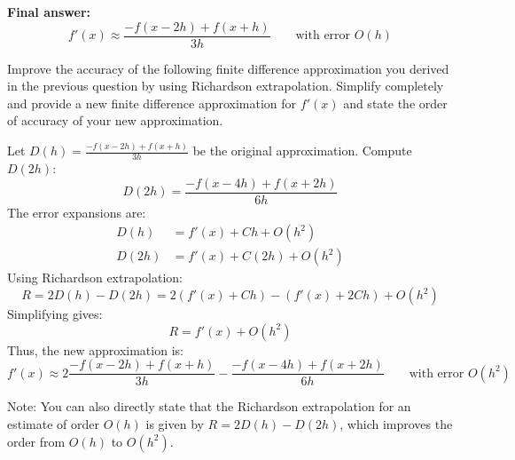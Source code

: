 \documentclass[reqno, answers]{exam}
\begin{document}
\begin{questions}
\begin{solution}
    \textbf{Final answer:}
    \[
      \boxed{
        f'(x) \approx \frac{-f(x-2h) + f(x+h)}{3h}
      }
      \qquad \text{with error } O(h)
    \]
  \end{solution}

  \newpage

  \question[8]
  Improve the accuracy of the following finite difference approximation you derived in the previous question by using Richardson extrapolation. Simplify completely and provide a new finite difference approximation for $f'(x)$ and state the order of accuracy of your new approximation.

  \begin{solution}
    Let $D(h) = \frac{-f(x-2h) + f(x+h)}{3h}$ be the original approximation. Compute $D(2h)$:
    \[
      D(2h) = \frac{-f(x-4h) + f(x+2h)}{6h}
    \]
    The error expansions are:
    \begin{align*}
      D(h) &= f'(x) + C h + O(h^2) \\
      D(2h) &= f'(x) + C (2h) + O(h^2)
    \end{align*}
    Using Richardson extrapolation:
    \[
      R = 2 D(h) - D(2h) = 2\left(f'(x) + C h\right) - \left(f'(x) + 2C h\right) + O(h^2)
    \]
    Simplifying gives:
    \[
      R = f'(x) + O(h^2)
    \]
    Thus, the new approximation is:
    \[
      \boxed{
        f'(x) \approx 2\frac{-f(x-2h) + f(x+h)}{3h} - \frac{-f(x-4h) + f(x+2h)}{6h}
      }
      \qquad \text{with error } O(h^2)
    \]

      Note: You can also directly state that the Richardson extrapolation for an estimate of order $O(h)$ is given by $R = 2 D(h) - D(2h)$, which improves the order from $O(h)$ to $O(h^2)$.  
  \end{solution}


  \newpage


\end{questions}
\end{document}
